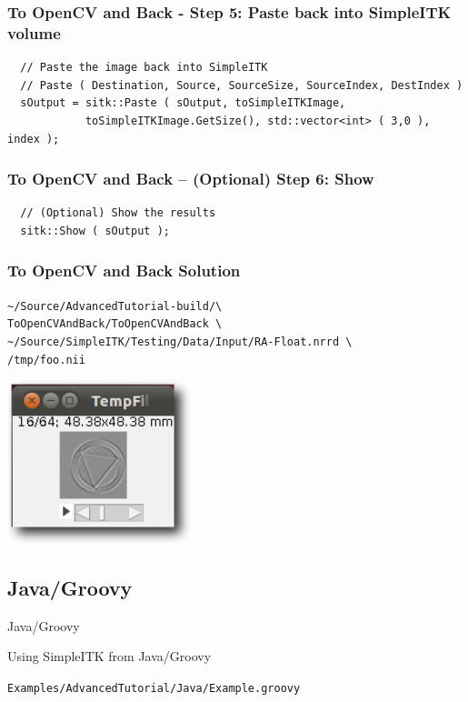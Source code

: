 \begin{frame}[fragile]
\frametitle{To OpenCV and Back - Step 5: Paste back into SimpleITK volume}
\begin{lstlisting}
  // Paste the image back into SimpleITK
  // Paste ( Destination, Source, SourceSize, SourceIndex, DestIndex )
  sOutput = sitk::Paste ( sOutput, toSimpleITKImage,
            toSimpleITKImage.GetSize(), std::vector<int> ( 3,0 ), index );
\end{lstlisting}
\end{frame}

\begin{frame}[fragile]
\frametitle{To OpenCV and Back -- (Optional) Step 6: Show}
\begin{lstlisting}
  // (Optional) Show the results
  sitk::Show ( sOutput );
\end{lstlisting}
\end{frame}

\begin{frame}[fragile]
\frametitle{To OpenCV and Back Solution}
\texttt{\textasciitilde/Source/AdvancedTutorial-build/\textbackslash\\
ToOpenCVAndBack/ToOpenCVAndBack \textbackslash \\
  \textasciitilde/Source/SimpleITK/Testing/Data/Input/RA-Float.nrrd \textbackslash \\
  /tmp/foo.nii}
\begin{center}
  \includegraphics[width=0.4\textwidth]{Images/ToOpenCVAndBackSolution_shadow}
\end{center}
\end{frame}


\subsection{Java/Groovy}

\begin{frame}{Java/Groovy}
\fontsize{36pt}{36pt}\selectfont
\center
\begin{center}
Using SimpleITK from Java/Groovy
\end{center}
\vspace{20pt}
\begin{center}
\fontsize{11pt}{11pt}\selectfont
\texttt{Examples/AdvancedTutorial/Java/Example.groovy}
\end{center}
\end{frame}


